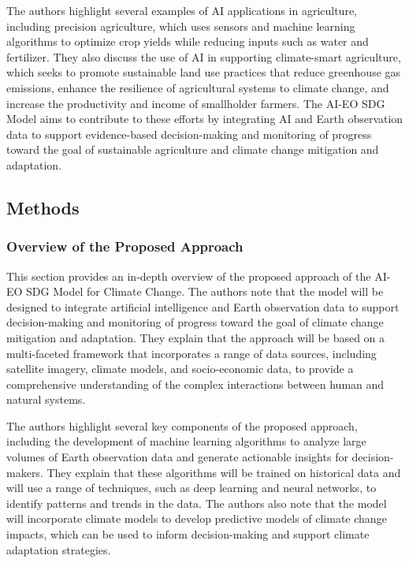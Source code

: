 \documentclass[draft, {\secondLanguage}, english]{volcanica-template}
\begin{document}
The authors highlight several examples of AI applications in agriculture, including precision agriculture, which uses sensors and machine learning algorithms to optimize crop yields while reducing inputs such as water and fertilizer. They also discuss the use of AI in supporting climate-smart agriculture, which seeks to promote sustainable land use practices that reduce greenhouse gas emissions, enhance the resilience of agricultural systems to climate change, and increase the productivity and income of smallholder farmers. The AI-EO SDG Model aims to contribute to these efforts by integrating AI and Earth observation data to support evidence-based decision-making and monitoring of progress toward the goal of sustainable agriculture and climate change mitigation and adaptation.
\subsection{Methods}\label{sec:02c}
\subsubsection{Overview of the Proposed Approach}\label{sec:02ca}
This section provides an in-depth overview of the proposed approach of the AI-EO SDG Model for Climate Change. The authors note that the model will be designed to integrate artificial intelligence and Earth observation data to support decision-making and monitoring of progress toward the goal of climate change mitigation and adaptation. They explain that the approach will be based on a multi-faceted framework that incorporates a range of data sources, including satellite imagery, climate models, and socio-economic data, to provide a comprehensive understanding of the complex interactions between human and natural systems.

The authors highlight several key components of the proposed approach, including the development of machine learning algorithms to analyze large volumes of Earth observation data and generate actionable insights for decision-makers. They explain that these algorithms will be trained on historical data and will use a range of techniques, such as deep learning and neural networks, to identify patterns and trends in the data. The authors also note that the model will incorporate climate models to develop predictive models of climate change impacts, which can be used to inform decision-making and support climate adaptation strategies.
\end{document}
